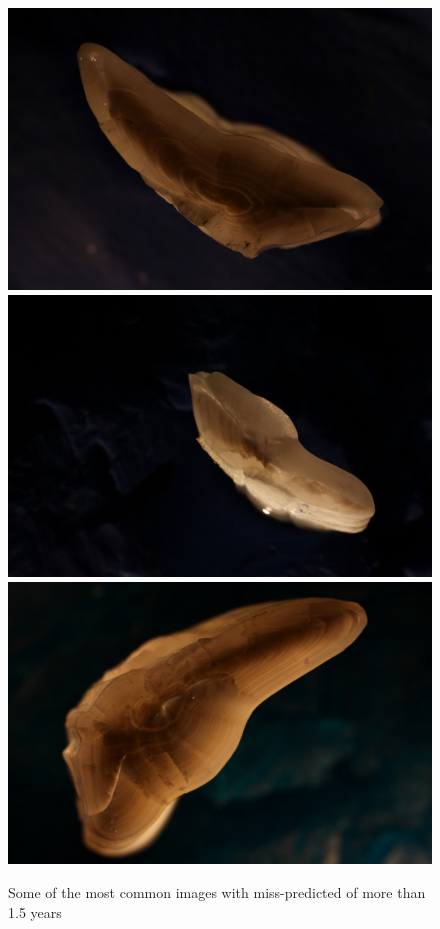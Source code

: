 \documentclass[10pt,letterpaper]{article}
\begin{document}
\begin{figure}[h!]
  \caption{Some of the most common images with miss-predicted of more than 1.5 years}
  \centering
  \includegraphics[scale=0.08]{outliers/IMG_0284_13.JPG}
  \includegraphics[scale=0.08]{outliers/IMG_0230_71.JPG}
  \includegraphics[scale=0.08]{outliers/IMG_0104_270.JPG} 


\end{figure}
\end{document}
